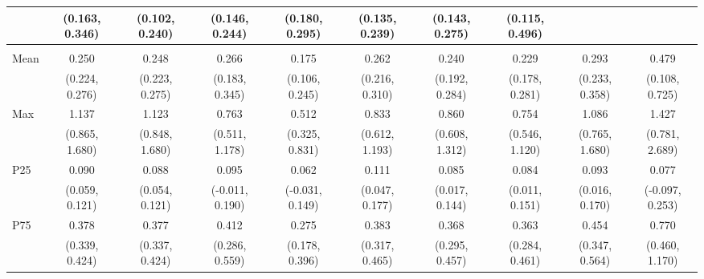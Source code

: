 {\begin{tabular}{l|c|c|c|c|c|c|c|c|c}
& {\scriptsize (0.163, 0.346)}
& {\scriptsize (0.102, 0.240)}
& {\scriptsize (0.146, 0.244)}
& {\scriptsize (0.180, 0.295)}
& {\scriptsize (0.135, 0.239)}
& {\scriptsize (0.143, 0.275)}
& {\scriptsize (0.115, 0.496)}
\\ [0.1cm]
\hline
\noalign{\smallskip}
\multicolumn{10}{l}{\textbf{Effect with Leads and Lags}} \\
\noalign{\smallskip}
\hline
Mean
& 0.250 & 0.248 & 0.266 & 0.175 & 0.262 & 0.240 & 0.229 & 0.293 & 0.479 \\
& {\scriptsize (0.224, 0.276)}
& {\scriptsize (0.223, 0.275)}
& {\scriptsize (0.183, 0.345)}
& {\scriptsize (0.106, 0.245)}
& {\scriptsize (0.216, 0.310)}
& {\scriptsize (0.192, 0.284)}
& {\scriptsize (0.178, 0.281)}
& {\scriptsize (0.233, 0.358)}
& {\scriptsize (0.108, 0.725)}
\\ [0.1cm]
\hline
Max
& 1.137 & 1.123 & 0.763 & 0.512 & 0.833 & 0.860 & 0.754 & 1.086 & 1.427 \\
& {\scriptsize (0.865, 1.680)}
& {\scriptsize (0.848, 1.680)}
& {\scriptsize (0.511, 1.178)}
& {\scriptsize (0.325, 0.831)}
& {\scriptsize (0.612, 1.193)}
& {\scriptsize (0.608, 1.312)}
& {\scriptsize (0.546, 1.120)}
& {\scriptsize (0.765, 1.680)}
& {\scriptsize (0.781, 2.689)}
\\ [0.1cm]
\hline
P25
& 0.090 & 0.088 & 0.095 & 0.062 & 0.111 & 0.085 & 0.084 & 0.093 & 0.077 \\
& {\scriptsize (0.059, 0.121)}
& {\scriptsize (0.054, 0.121)}
& {\scriptsize (-0.011, 0.190)}
& {\scriptsize (-0.031, 0.149)}
& {\scriptsize (0.047, 0.177)}
& {\scriptsize (0.017, 0.144)}
& {\scriptsize (0.011, 0.151)}
& {\scriptsize (0.016, 0.170)}
& {\scriptsize (-0.097, 0.253)}
\\ [0.1cm]
\hline
P75
& 0.378 & 0.377 & 0.412 & 0.275 & 0.383 & 0.368 & 0.363 & 0.454 & 0.770 \\
& {\scriptsize (0.339, 0.424)}
& {\scriptsize (0.337, 0.424)}
& {\scriptsize (0.286, 0.559)}
& {\scriptsize (0.178, 0.396)}
& {\scriptsize (0.317, 0.465)}
& {\scriptsize (0.295, 0.457)}
& {\scriptsize (0.284, 0.461)}
& {\scriptsize (0.347, 0.564)}
& {\scriptsize (0.460, 1.170)}
\\ [0.1cm]
\hline
\hline
\end{tabular}
}
